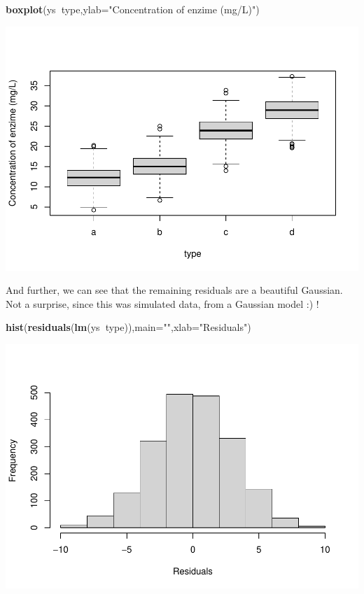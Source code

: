 \documentclass[
]{book}
\newenvironment{Shaded}{\begin{snugshade}}{\end{snugshade}}
\newcommand{\DataTypeTok}[1]{\textcolor[rgb]{0.13,0.29,0.53}{#1}}
\newcommand{\KeywordTok}[1]{\textcolor[rgb]{0.13,0.29,0.53}{\textbf{#1}}}
\newcommand{\NormalTok}[1]{#1}
\newcommand{\OperatorTok}[1]{\textcolor[rgb]{0.81,0.36,0.00}{\textbf{#1}}}
\newcommand{\StringTok}[1]{\textcolor[rgb]{0.31,0.60,0.02}{#1}}
\begin{document}
\begin{Shaded}
\begin{Highlighting}[]
\KeywordTok{boxplot}\NormalTok{(ys}\OperatorTok{~}\NormalTok{type,}\DataTypeTok{ylab=}\StringTok{"Concentration of enzime (mg/L)"}\NormalTok{)}
\end{Highlighting}
\end{Shaded}

\includegraphics{ECOMODbook_files/figure-latex/reg11-1.pdf}

And further, we can see that the remaining residuals are a beautiful Gaussian. Not a surprise, since this was simulated data, from a Gaussian model :) !

\begin{Shaded}
\begin{Highlighting}[]
\KeywordTok{hist}\NormalTok{(}\KeywordTok{residuals}\NormalTok{(}\KeywordTok{lm}\NormalTok{(ys}\OperatorTok{~}\NormalTok{type)),}\DataTypeTok{main=}\StringTok{""}\NormalTok{,}\DataTypeTok{xlab=}\StringTok{"Residuals"}\NormalTok{)}
\end{Highlighting}
\end{Shaded}

\includegraphics{ECOMODbook_files/figure-latex/reg12-1.pdf}
\end{document}
